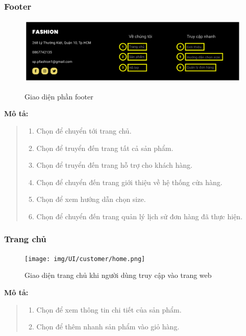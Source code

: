     \subsubsection{Footer}
    \begin{figure}[!htp]
        \centering
        \includegraphics[width=5in]{img/UI/customer/footer.png}
        \label{7}
        \newline
        \caption{Giao diện phần footer}
    \end{figure}
    \textbf{Mô tả:}  
    \begin{quote}
        \begin{enumerate}
            \item Chọn để chuyển tới trang chủ.
            \item Chọn để truyển đến trang tất cả sản phẩm.
            \item Chọn để truyển đến trang hỗ trợ cho khách hàng.
            \item Chọn để chuyển đến trang giới thiệu về hệ thống cửa hàng.
            \item Chọn để xem hướng dẫn chọn size.
            \item Chọn để chuyển đến trang quản lý lịch sử đơn hàng đã thực hiện.
        \end{enumerate}
    \end{quote}
    
    \newpage
    \subsubsection{Trang chủ}
    \begin{figure}[!htp]
        \centering
        \texttt{[image: img/UI/customer/home.png]}
        \label{8}
        \newline
        \caption{Giao diện trang chủ khi người dùng truy cập vào trang web}
    \end{figure}
    \textbf{Mô tả:}  
    \begin{quote}
        \begin{enumerate}
            \item Chọn để xem thông tin chi tiết của sản phẩm.
            \item Chọn để thêm nhanh sản phẩm vào giỏ hàng.
        \end{enumerate}
    \end{quote}    
    
